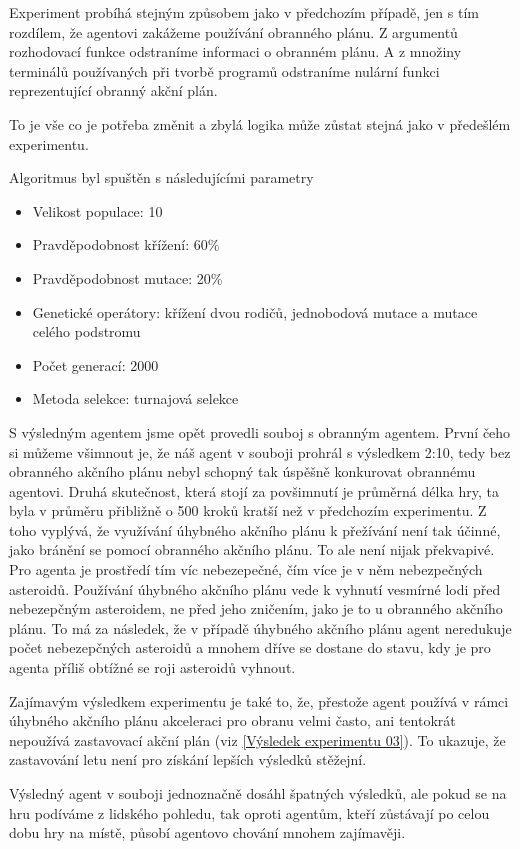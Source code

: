 \par
{}
Experiment probíhá stejným způsobem jako v předchozím případě, jen s tím rozdílem, že agentovi zakážeme používání obranného plánu. 
Z argumentů rozhodovací funkce odstraníme informaci o obranném plánu. 
A z množiny terminálů používaných při tvorbě programů odstraníme nulární funkci reprezentující obranný akční plán.

\par
{}
To je vše co je potřeba změnit a zbylá logika může zůstat stejná jako v předešlém experimentu.

Algoritmus byl spuštěn s následujícími parametry
\begin{itemize}
    \item Velikost populace: 10
    \item Pravděpodobnost křížení: 60\%
    \item Pravděpodobnost mutace: 20\%
    \item Genetické operátory: křížení dvou rodičů, jednobodová mutace a mutace celého podstromu
    \item Počet generací: 2000
    \item Metoda selekce: turnajová selekce
\end{itemize}

S výsledným agentem jsme opět provedli souboj s obranným agentem.
První čeho si můžeme všimnout je, že náš agent v souboji prohrál s výsledkem 2:10, tedy bez obranného akčního plánu nebyl schopný tak úspěšně konkurovat obrannému agentovi.
Druhá skutečnost, která stojí za povšimnutí je průměrná délka hry, ta byla v průměru přibližně o 500 kroků kratší než v předchozím experimentu. 
Z toho vyplývá, že využívání úhybného akčního plánu k přežívání není tak účinné, jako bránění se pomocí obranného akčního plánu. 
To ale není nijak překvapivé. Pro agenta je prostředí tím víc nebezepečné, čím více je v něm nebezpečných asteroidů. 
Používání úhybného akčního plánu vede k vyhnutí vesmírné lodi před nebezepčným asteroidem, ne před jeho zničením, jako je to u obranného akčního plánu. To má za následek, že v případě úhybného akčního plánu agent neredukuje počet nebezepčných asteroidů a mnohem dříve se dostane do stavu, kdy je pro agenta příliš obtížné se roji asteroidů vyhnout. 

\par
Zajímavým výsledkem experimentu je také to, že, přestože agent používá v rámci úhybného akčního plánu akceleraci pro obranu velmi často, ani tentokrát nepoužívá zastavovací akční plán (viz \ref{Výsledek experimentu 03}).
To ukazuje, že zastavování letu není pro získání lepších výsledků stěžejní.
\par
Výsledný agent v souboji jednoznačně dosáhl špatných výsledků, ale pokud se na hru podíváme z lidského pohledu, tak oproti agentům, kteří zůstávají po celou dobu hry na místě, působí agentovo chování mnohem zajímavěji.



